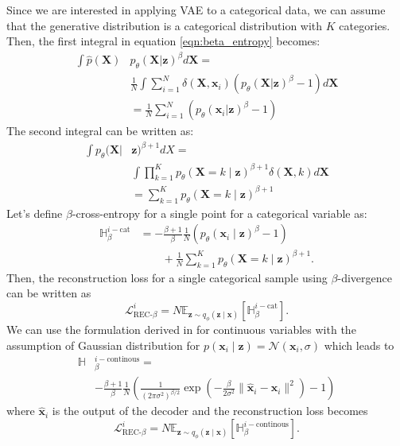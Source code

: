 \documentclass{article}
\def\bx{\mathbf{x}}
\def\bX{\mathbf{X}}
\def\bz{\mathbf{z}}
\theoremstyle{plain}
\theoremstyle{definition}
\begin{document}
Since we are interested in applying VAE to a categorical data, we can assume  that the generative distribution is a categorical distribution with $K$ categories. Then, the first integral in equation \ref{eqn:beta_entropy} becomes:
\begin{equation}
\begin{split}
\int \hat{p}(\bX) &  p_{\theta}(\bX | \bz)^{\beta }d \bX = \\
& \frac{1}{N} \int \sum_{i=1}^N \delta(\bX, \bx_i) \left( p_{\theta}(\bX | \bz)^{\beta} - 1 \right) d \bX   \\
&= \frac{1}{N} \sum_{i=1}^N  \left( p_{\theta}(\bx_i | \bz)^{\beta} - 1 \right)
\end{split}
\end{equation}
The second integral can be written as:
\begin{equation}
\begin{split}
\int p_{\theta}(\bX | & \bz)^{\beta + 1} dX = \\
& \int \prod_{k=1}^K p_{\theta}( \bX = k \mid \bz)^{\beta + 1} \delta (\bX, k) d \bX  \\
&= \sum_{k=1}^K p_{\theta}(\bX = k \mid \bz)^{\beta + 1}
\end{split}
\end{equation}
Let's define $\beta$-cross-entropy for a single point for a categorical variable as:
\begin{equation}
\begin{split}
\mathbb{H}_{\beta}^{i-\textrm{cat}} &= - \frac{\beta + 1}{\beta} \frac{1}{N} \left( p_{\theta}(\bx_i \mid \bz)^{\beta} - 1 \right) \\
& \quad \quad + \frac{1}{N} \sum_{k=1}^K p_{\theta}(\bX = k \mid \bz)^{\beta + 1}.
\end{split}
\end{equation}
Then, the reconstruction loss for a single categorical sample using $\beta$-divergence can be written as
\begin{equation}
\mathcal{L}_{\textrm{REC-} \beta}^i = N \mathbb{E}_{\bz \sim q_{\phi}(\bz \mid \bx)} \left [ \mathbb{H}_{\beta}^{i-\textrm{cat}} \right ].
\label{eqn:L_rec_beta_cat}
\end{equation}
We can use the formulation derived in \citet{akrami2019robust} for continuous variables with the assumption of Gaussian distribution for $p(\bx_i \mid \bz) = \mathcal{N}(\bx_i, \sigma)$ which leads to
\begin{equation}
\begin{split}
\mathbb{H} & _{\beta}^{i-\textrm{continous}} = \\
&- \frac{\beta + 1}{\beta} \frac{1}{N} \left( \frac{1}{(2 \pi \sigma^2)^{\beta/2}} \exp \left( - \frac{\beta}{2 \sigma^2} \| \hat{\bx}_i - \bx_i \|^2 \right) - 1 \right)
\end{split}
\end{equation}
where $\hat{\bx}_i$ is the output of the decoder and the reconstruction loss becomes
\begin{equation}
\mathcal{L}_{\textrm{REC-} \beta}^i = N \mathbb{E}_{\bz \sim q_{\phi}(\bz \mid \bx)} \left [ \mathbb{H}_{\beta}^{i-\textrm{continous}} \right ].
\label{eqn:L_rec_beta_continous}
\end{equation}
\end{document}
